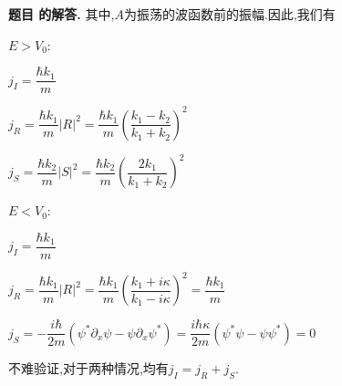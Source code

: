 \documentclass[12pt, a4paper, oneside]{ctexart}
\newcounter{problemname}
\newenvironment{solution}
  {\par\noindent\textbf{题目 \theproblemname 的解答. }}
  {\par}
\begin{document}
\begin{solution}
  其中,$A$为振荡的波函数前的振幅.因此,我们有

  $E>V_0$:

  \centerline{$j_I = \dfrac{\hbar k_1}{m}$}

  \centerline{$j_R = \dfrac{\hbar k_1}{m} |R|^2 = \dfrac{\hbar k_1}{m} \left(\dfrac{k_1 - k_2}{k_1+k_2}\right)^2$}

  \centerline{$j_S = \dfrac{\hbar k_2}{m} |S|^2 = \dfrac{\hbar k_2}{m} \left(\dfrac{2k_1}{k_1+k_2}\right)^2$}

  $E<V_0$:

  \centerline{$j_I = \dfrac{\hbar k_1}{m}$}

  \centerline{$j_R = \dfrac{\hbar k_1}{m} |R|^2 = \dfrac{\hbar k_1}{m} \left(\dfrac{k_1 + i\kappa}{k_1 - i\kappa}\right)^2 = \dfrac{\hbar k_1}{m}$}

  \centerline{$j_S = -\dfrac{i\hbar}{2m} \left(\psi^* \partial_x \psi - \psi \partial_x \psi^*\right) = \dfrac{i\hbar \kappa}{2m} \left( \psi^* \psi - \psi \psi^*\right) = 0$}

  不难验证,对于两种情况,均有$j_I = j_R + j_S$.
\end{solution}
\end{document}
